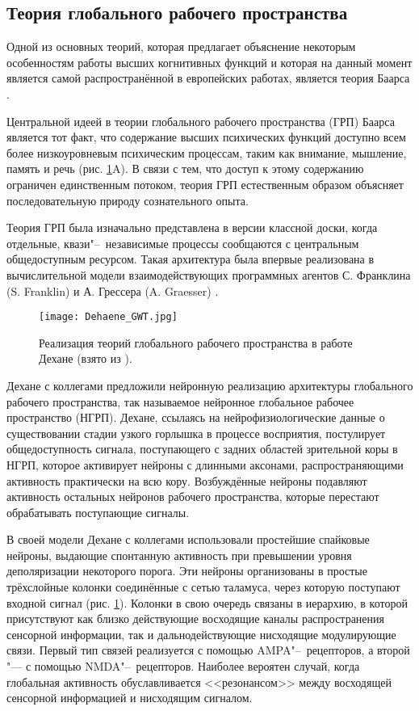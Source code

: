 \subsection{Теория глобального рабочего пространства}\label{subsect1_2_1}

Одной из основных теорий, которая предлагает объяснение некоторым особенностям работы высших когнитивных функций и которая на данный момент является самой распространённой в европейских работах, является теория Баарса \cite{Baars1988,Baars2005}.

Центральной идеей в теории глобального рабочего пространства (ГРП) Баарса является тот факт, что содержание высших психических функций доступно всем более низкоуровневым психическим процессам, таким как внимание, мышление, память и речь (рис. \ref{fg:dehaene_gwt}A). В связи с тем, что доступ к этому содержанию ограничен единственным потоком, теория ГРП естественным образом объясняет последовательную природу сознательного опыта.

Теория ГРП была изначально представлена в версии классной доски, когда отдельные, квази"--~независимые процессы сообщаются с центральным общедоступным ресурсом. Такая архитектура была впервые реализована в вычислительной модели взаимодействующих программных агентов С. Франклина (S. Franklin) и А. Грессера (A. Graesser) \cite{Franklin1999}.

\begin{figure}[h]
	\centering	
	\texttt{[image: Dehaene\_GWT.jpg]}
	\caption{Реализация теорий глобального рабочего пространства в работе Дехане (взято из \cite{Dehaene2003}).}
	\label{fg:dehaene_gwt}
\end{figure}

Дехане с коллегами \cite{Dehaene2003} предложили нейронную реализацию архитектуры глобального рабочего пространства, так называемое нейронное глобальное рабочее пространство (НГРП). Дехане, ссылаясь на нейрофизиологические данные о существовании стадии узкого горлышка в процессе восприятия, постулирует общедоступность сигнала, поступающего с задних областей зрительной коры в НГРП, которое активирует нейроны с длинными аксонами, распространяющими активность практически на всю кору. Возбуждённые нейроны подавляют активность остальных нейронов рабочего пространства, которые перестают обрабатывать поступающие сигналы. 

В своей модели Дехане с коллегами использовали простейшие спайковые нейроны, выдающие спонтанную активность при превышении уровня деполяризации некоторого порога. Эти нейроны организованы в простые трёхслойные колонки соединённые с сетью таламуса, через которую поступают входной сигнал (рис. \ref{fg:dehaene_gwt}). Колонки в свою очередь связаны в иерархию, в которой присутствуют как близко действующие восходящие каналы распространения сенсорной информации, так и дальнодействующие нисходящие модулирующие связи. Первый тип связей реализуется с помощью AMPA"--~рецепторов, а второй "--- с помощью NMDA"--~рецепторов. Наиболее вероятен случай, когда глобальная активность обуславливается <<резонансом>> между восходящей сенсорной информацией и нисходящим сигналом.

